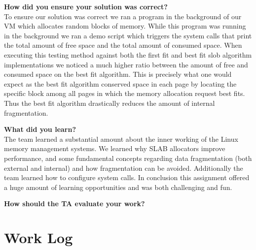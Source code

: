 \documentclass[10pt,onecolumn,draftclsnofoot]{IEEEtran} %
\begin{document}
\begin{singlespace}
	\textbf{How did you ensure your solution was correct?}\\
                \normalfont \indent To ensure our solution was correct we ran a program in the background of our VM which allocates random blocks of memory. While this program was running in the background we ran a demo script which triggers the system calls that print the total amount of free space and the total amount of consumed space. When executing this testing method against both the first fit and best fit slob algorithm implementations we noticed a much higher ratio between the amount of free and consumed space on the best fit algorithm. This is precisely what one would expect as the best fit algorithm conserved space in each page by locating the specific block among all pages in which the memory allocation request best fits. Thus the best fit algorithm drastically reduces the amount of internal fragmentation. 
  
        \textbf{What did you learn?}\\
        		\normalfont \indent The team learned a substantial amount about the inner working of the Linux memory management systems. We learned why SLAB allocators improve performance, and some fundamental concepts regarding data fragmentation (both external and internal) and how fragmentation can be avoided. Additionally the team learned how to configure system calls. In conclusion this assignment offered a huge amount of learning opportunities and was both challenging and fun. 

        \textbf{How should the TA evaluate your work?}\\
	\section{\bf Work Log}


\newpage


\end{singlespace}
\restoregeometry
\end{document}
